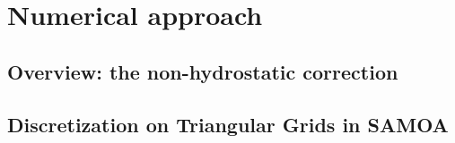 
\section{Numerical approach}
\subsection{Overview: the non-hydrostatic correction}
\subsection{Discretization on Triangular Grids in SAMOA}
